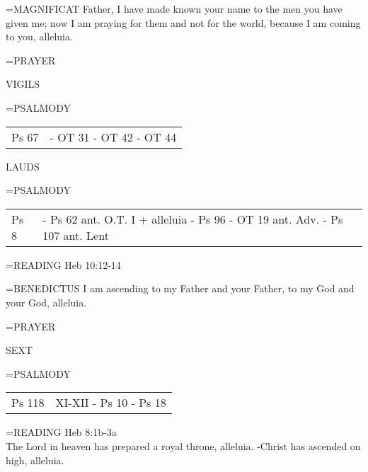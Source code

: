 \hangindent=\parindent \small{MAGNIFICAT 	Father, I have made known your name to the men you have given me; now I am praying for them and not for the world, because I am coming to you, alleluia.\\}

\hangindent=\parindent \small{PRAYER 	}

\begin{flushleft}\normalsize VIGILS\\\end{flushleft}
\hangindent=\parindent \small{PSALMODY}
\begin{center}
\begin{tabular}{ l l }
Ps 67 &  - OT 31 - OT 42 - OT 44\\
\end{tabular}
\end{center}		

\begin{flushleft}\normalsize LAUDS\\\end{flushleft}
\hangindent=\parindent \small{PSALMODY}
\begin{center}
\begin{tabular}{ l l }
Ps 8 &  - Ps 62 ant. O.T. I + alleluia - Ps 96 - OT 19 ant. Adv. - Ps 107 ant. Lent\\
\end{tabular}
\end{center}		

\hangindent=\parindent \small{\uppercase{READING}}    Heb 10:12-14 \textbf{   \\}

\hangindent=\parindent \small{BENEDICTUS 	I am ascending to my Father and your Father, to my God and your God, alleluia.\\}

\hangindent=\parindent \small{PRAYER 	}

\begin{flushleft}\normalsize SEXT\\\end{flushleft}
\hangindent=\parindent \small{PSALMODY}
\begin{center}
\begin{tabular}{ l l }
Ps 118 &  XI-XII - Ps 10 - Ps 18\\
\end{tabular}
\end{center}		

\hangindent=\parindent \small{\uppercase{READING}}    Heb 8:1b-3a \textbf{   \\}
The Lord in heaven has prepared a royal throne, alleluia.
-Christ has ascended on high, alleluia.

